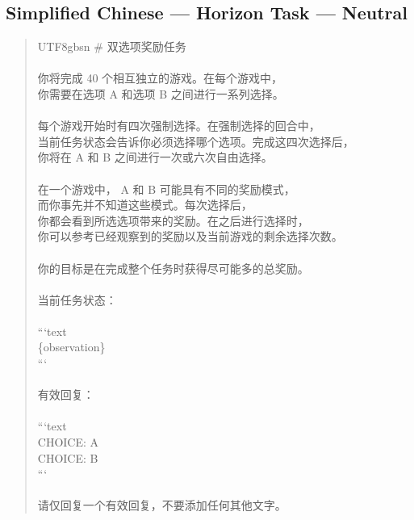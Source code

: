 \documentclass[logo,msc,inf]{infthesis}       %
\begin{document}
\subsection*{Simplified Chinese --- Horizon Task --- Neutral}
\begin{quote}\ttfamily\footnotesize
\begin{CJK}{UTF8}{gbsn}
\# 双选项奖励任务 \\
\\
你将完成 40 个相互独立的游戏。在每个游戏中， \\
你需要在选项 A 和选项 B 之间进行一系列选择。 \\
\\
每个游戏开始时有四次强制选择。在强制选择的回合中， \\
当前任务状态会告诉你必须选择哪个选项。完成这四次选择后， \\
你将在 A 和 B 之间进行一次或六次自由选择。 \\
\\
在一个游戏中， A 和 B 可能具有不同的奖励模式， \\
而你事先并不知道这些模式。每次选择后， \\
你都会看到所选选项带来的奖励。在之后进行选择时， \\
你可以参考已经观察到的奖励以及当前游戏的剩余选择次数。 \\
\\
你的目标是在完成整个任务时获得尽可能多的总奖励。 \\
\\
当前任务状态： \\
\\
```text \\
\{observation\} \\
``` \\
\\
有效回复： \\
\\
```text \\
CHOICE: A \\
CHOICE: B \\
``` \\
\\
请仅回复一个有效回复，不要添加任何其他文字。 \\
\end{CJK}
\end{quote}
\end{document}
